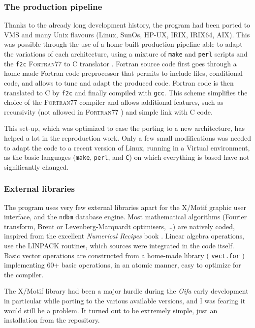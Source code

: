 \hypertarget{the-production-pipeline}{%
\subsubsection{The production pipeline}\label{the-production-pipeline}}

Thanks to the already long development history, the program had been
ported to VMS and many Unix flavours (Linux, SunOs, HP-UX, IRIX, IRIX64,
AIX). This was possible through the use of a home-built production
pipeline able to adapt the variations of each architecture, using a
mixture of \texttt{make} and \texttt{perl} scripts and the \texttt{f2c}
F\textsc{ortran}77 to C translator \cite{f2c}. Fortran source code first
goes through a home-made Fortran code preprocessor that
permits to include files, conditional code, and allows to tune and adapt
the produced code. Fortran code is then translated to C by \texttt{f2c}
and finally compiled with \texttt{gcc}. This scheme simplifies the
choice of the F\textsc{ortran}77 compiler and allows additional
features, such as recursivity (not allowed in F\textsc{ortran}77 ) and
simple link with C code.

This set-up, which was optimized to ease the porting to a new
architecture, has helped a lot in the reproduction work. Only a few
small modifications was needed to adapt the code to a recent version of
Linux, running in a Virtual environment, as the basic languages
(\texttt{make}, \texttt{perl}, and \texttt{C}) on which everything is
based have not significantly changed.

\hypertarget{External-libraries}{%
\subsubsection{External libraries}\label{External-libraries}}

The program uses very few external libraries apart for the X/Motif graphic user
interface, and the \texttt{ndbm} database engine. Most mathematical
algorithms (Fourier transform, Brent or Levenberg-Marquardt optimisers,
\ldots{}) are natively coded, inspired from the excellent
\emph{Numerical Recipes} book \cite{press96}. Linear algebra operations, use
the LINPACK \cite{linpack} routines, which sources were integrated in
the code itself. Basic vector operations are constructed from a
home-made library ( \texttt{vect.for} ) implementing 60+ basic
operations, in an atomic manner, easy to optimize for the compiler.

The X/Motif library had been a major hurdle during the \emph{Gifa} early
development in particular while porting to the various available  versions, and
I was fearing it would still be a problem. It turned out to be extremely
simple, just an installation from the repository.

